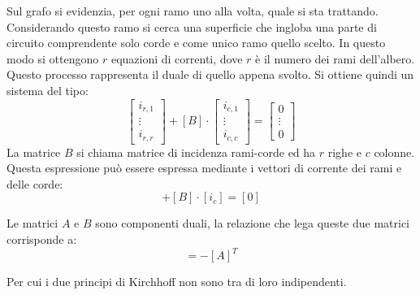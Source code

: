 \documentclass{article}
\numberwithin{equation}{subsection}
\begin{document}
Sul grafo si evidenzia, per ogni ramo uno alla volta, quale si sta trattando. Considerando questo ramo si cerca una superficie che ingloba una parte di circuito comprendente 
solo corde e come unico ramo quello scelto. In questo modo si ottengono $r$ equazioni di correnti, dove $r$ è il numero dei rami dell'albero. Questo processo rappresenta il duale 
di quello appena svolto. Si ottiene quindi un sistema del tipo:
\begin{equation*}
    \begin{bmatrix}
        i_{r,1}\\
        \vdots\\
        i_{r,r}
    \end{bmatrix}+[B]\cdot\begin{bmatrix}
        i_{c,1}\\
        \vdots\\
        i_{c,c}
    \end{bmatrix}=\begin{bmatrix}
        0\\
        \vdots\\
        0
    \end{bmatrix}
\end{equation*}
La matrice $B$ si chiama matrice di incidenza rami-corde ed ha $r$ righe e $c$ colonne. Questa espressione può essere espressa mediante i vettori di corrente dei rami e delle 
corde:
\begin{equation*}
    [i_{r}]+[B]\cdot [i_{c}]=[0]
\end{equation*}

Le matrici $A$ e $B$ sono componenti duali, la relazione che lega queste due matrici corrisponde a:
\begin{equation*}
    [B]=-[A]^T
\end{equation*}

Per cui i due principi di Kirchhoff non sono tra di loro indipendenti. 
\end{document}
